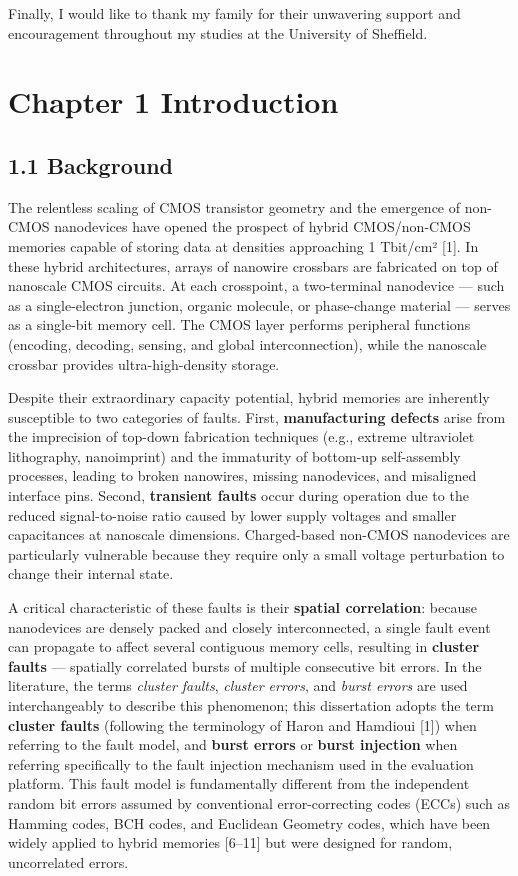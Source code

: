 \documentclass[
  english,
  12pt,
]{report}
\begin{document}
Finally, I would like to thank my family for their unwavering support
and encouragement throughout my studies at the University of Sheffield.

\tableofcontents
\newpage

\chapter{Chapter 1 Introduction}\label{chapter-1-introduction}

\section{1.1 Background}\label{background}

The relentless scaling of CMOS transistor geometry and the emergence of
non-CMOS nanodevices have opened the prospect of hybrid CMOS/non-CMOS
memories capable of storing data at densities approaching 1 Tbit/cm²
{[}1{]}. In these hybrid architectures, arrays of nanowire crossbars are
fabricated on top of nanoscale CMOS circuits. At each crosspoint, a
two-terminal nanodevice --- such as a single-electron junction, organic
molecule, or phase-change material --- serves as a single-bit memory
cell. The CMOS layer performs peripheral functions (encoding, decoding,
sensing, and global interconnection), while the nanoscale crossbar
provides ultra-high-density storage.

Despite their extraordinary capacity potential, hybrid memories are
inherently susceptible to two categories of faults. First,
\textbf{manufacturing defects} arise from the imprecision of top-down
fabrication techniques (e.g., extreme ultraviolet lithography,
nanoimprint) and the immaturity of bottom-up self-assembly processes,
leading to broken nanowires, missing nanodevices, and misaligned
interface pins. Second, \textbf{transient faults} occur during operation
due to the reduced signal-to-noise ratio caused by lower supply voltages
and smaller capacitances at nanoscale dimensions. Charged-based non-CMOS
nanodevices are particularly vulnerable because they require only a
small voltage perturbation to change their internal state.

A critical characteristic of these faults is their \textbf{spatial
correlation}: because nanodevices are densely packed and closely
interconnected, a single fault event can propagate to affect several
contiguous memory cells, resulting in \textbf{cluster faults} ---
spatially correlated bursts of multiple consecutive bit errors. In the
literature, the terms \emph{cluster faults}, \emph{cluster errors}, and
\emph{burst errors} are used interchangeably to describe this
phenomenon; this dissertation adopts the term \textbf{cluster faults}
(following the terminology of Haron and Hamdioui {[}1{]}) when referring
to the fault model, and \textbf{burst errors} or \textbf{burst
injection} when referring specifically to the fault injection mechanism
used in the evaluation platform. This fault model is fundamentally
different from the independent random bit errors assumed by conventional
error-correcting codes (ECCs) such as Hamming codes, BCH codes, and
Euclidean Geometry codes, which have been widely applied to hybrid
memories {[}6--11{]} but were designed for random, uncorrelated errors.
\end{document}
